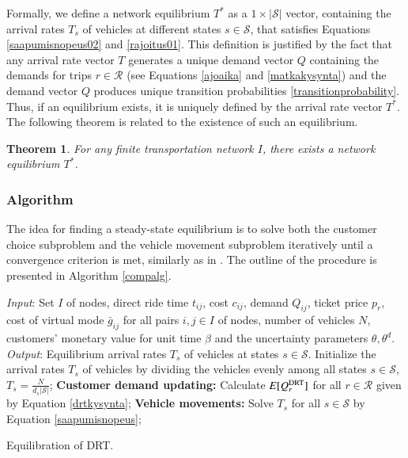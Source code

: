 \documentclass[dissertation,draft*]{aaltoseries}
\newtheorem{theorem}{Theorem}
\begin{document}
Formally, we define a network equilibrium $T^*$ as a $1 \times |\mathcal{S}|$ vector, containing the 
arrival rates $T_s$ of vehicles at different states $s \in \mathcal{S}$, that satisfies Equations 
\eqref{saapumisnopeus02} and \eqref{rajoitus01}. This definition is justified by the fact that 
any arrival rate vector $T$ generates a unique demand vector $Q$ containing the demands for trips $r \in \mathcal{R}$ 
(see Equations \eqref{ajoaika} and \eqref{matkakysynta}) and the demand vector
$Q$ produces unique transition probabilities \eqref{transitionprobability}.
Thus, if an equilibrium exists, it is uniquely defined by the arrival rate vector $T^*$.
The following theorem is related to the existence of such an equilibrium.

\begin{theorem}
For any finite transportation network $I$, there exists a network equilibrium $T^*$.
\end{theorem}


\subsubsection{Algorithm}
\label{ratkaisu01}
The idea for finding a steady-state equilibrium is to solve 
both the customer choice subproblem and the vehicle movement subproblem iteratively 
until a convergence criterion is met, similarly as in \citep{yang2010}. 
The outline of the procedure is presented in Algorithm \ref{compalg}.

\begin{algorithm}[H]
\begin{algorithmic}
\STATE \emph{Input}: Set $I$ of nodes, direct ride time $t_{ij}$, cost $c_{ij}$, demand $Q_{ij}$,
ticket price $p_{r}$, cost of virtual mode $\bar{g}_{ij}$ 
for all pairs $i,j \in I$ of nodes, number of vehicles $N$, 
customers' monetary value for unit time $\beta$
and the uncertainty parameters $\theta,\theta^d$.
\STATE \emph{Output}: Equilibrium arrival rates $T_s$ of 
vehicles at states $s \in \mathcal{S}$.
\STATE Initialize the arrival rates $T_s$ of vehicles by dividing the vehicles
evenly among all states $s \in \mathcal{S}$, $T_{s} = \frac {N}{d_s |\mathcal{S}|}$; 
\REPEAT
\STATE \textbf{Customer demand updating:} Calculate $E[Q_{r}^{\rm DRT}]$ for all 
$r \in \mathcal{R}$ given by Equation \eqref{drtkysynta};
\STATE \textbf{Vehicle movements:} Solve $T_s$ for all $s \in \mathcal{S}$ by Equation \eqref{saapumisnopeus};
\end{algorithmic}
\caption{Equilibration of DRT.}
\label{compalg}
\end{algorithm}
\end{document}

